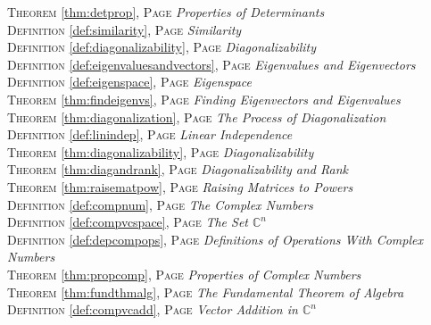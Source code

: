 \begin{multicols}{2}
{\textsc{Theorem} \ref{thm:detprop}, \textsc{Page} \pageref{thm:detprop} \textit{Properties of Determinants} \\
\textsc{Definition} \ref{def:similarity}, \textsc{Page} \pageref{def:similarity} \textit{Similarity} \\
\textsc{Definition} \ref{def:diagonalizability}, \textsc{Page} \pageref{def:diagonalizability} \textit{Diagonalizability} \\
\textsc{Definition} \ref{def:eigenvaluesandvectors}, \textsc{Page} \pageref{def:eigenvaluesandvectors} \textit{Eigenvalues and Eigenvectors} \\
\textsc{Definition} \ref{def:eigenspace}, \textsc{Page} \pageref{def:eigenspace} \textit{Eigenspace} \\
\textsc{Theorem} \ref{thm:findeigenvs}, \textsc{Page} \pageref{thm:findeigenvs} \textit{Finding Eigenvectors and Eigenvalues} \\
\textsc{Theorem} \ref{thm:diagonalization}, \textsc{Page} \pageref{thm:diagonalization} \textit{The Process of Diagonalization} \\
\textsc{Definition} \ref{def:linindep}, \textsc{Page} \pageref{def:linindep} \textit{Linear Independence} \\
\textsc{Theorem} \ref{thm:diagonalizability}, \textsc{Page} \pageref{thm:diagonalizability} \textit{Diagonalizability} \\
\textsc{Theorem} \ref{thm:diagandrank}, \textsc{Page} \pageref{thm:diagandrank} \textit{Diagonalizability and Rank} \\
\textsc{Theorem} \ref{thm:raisematpow}, \textsc{Page} \pageref{thm:raisematpow} \textit{Raising Matrices to Powers} \\
\textsc{Definition} \ref{def:compnum}, \textsc{Page} \pageref{def:compnum} \textit{The Complex Numbers} \\
\textsc{Definition} \ref{def:compvcspace}, \textsc{Page} \pageref{def:compvcspace} \textit{The Set \(\mathbb {C}^n\)} \\
\textsc{Definition} \ref{def:depcompops}, \textsc{Page} \pageref{def:depcompops} \textit{Definitions of Operations With Complex Numbers} \\
\textsc{Theorem} \ref{thm:propcomp}, \textsc{Page} \pageref{thm:propcomp} \textit{Properties of Complex Numbers} \\
\textsc{Theorem} \ref{thm:fundthmalg}, \textsc{Page} \pageref{thm:fundthmalg} \textit{The Fundamental Theorem of Algebra} \\
\textsc{Definition} \ref{def:compvcadd}, \textsc{Page} \pageref{def:compvcadd} \textit{Vector Addition in \(\mathbb {C}^n\)} \\
}
\end{multicols}
